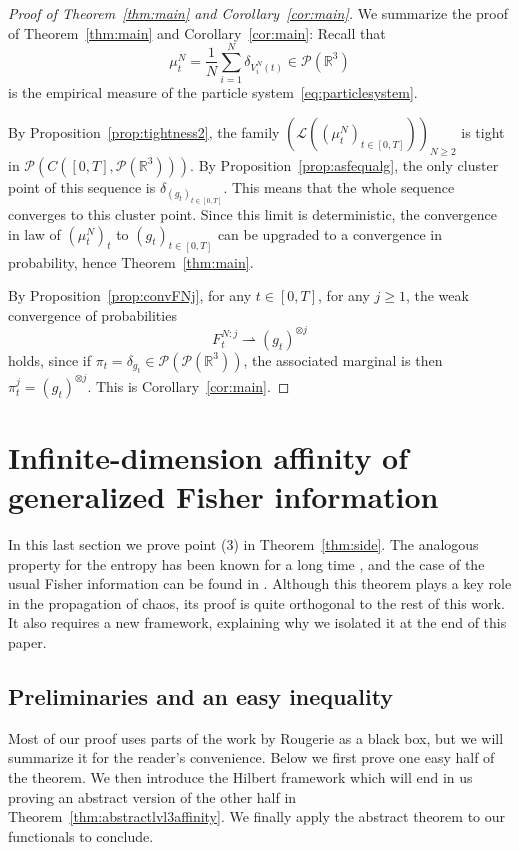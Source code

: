\documentclass[11pt,a4paper]{article}
\theoremstyle{definition}
\theoremstyle{plain}
\begin{document}
\begin{proof}[Proof of Theorem~\ref{thm:main} and Corollary~\ref{cor:main}]
We summarize the proof of Theorem~\ref{thm:main} and Corollary~\ref{cor:main}: Recall that $$\mu^N_t =\frac{1}{N}\sum_{i=1}^N \delta_{V^N_i(t)} \in \mathcal{P}(\mathbb{R}^3)$$ is the empirical measure of the particle system~\eqref{eq:particlesystem}.

By Proposition~\ref{prop:tightness2}, the family $\left(\mathcal{L}\left( (\mu^N_t)_{t\in[0,T]}\right) \right)_{N\geq 2 }$ is tight in $\mathcal{P} \left(C\left([0,T],\mathcal{P}(\mathbb{R}^3)\right)\right)$.
By Proposition~\ref{prop:asfequalg}, the only cluster point of this sequence is $\delta_{(g_t)_{t\in[0,T]}}$. This means that the whole sequence converges to this cluster point. Since this limit is deterministic, the convergence in law of $(\mu^N_t)_t$ to $(g_t)_{t\in[0,T]}$ can be upgraded to a convergence in probability, hence Theorem~\ref{thm:main}.

By Proposition~\ref{prop:convFNj}, for any $t\in[0,T]$, for any $j\geq 1$, the weak convergence of probabilities
$$F^{N:j}_t\rightharpoonup (g_t)^{\otimes j} $$
holds, since if $\pi_t=\delta_{g_t}\in\mathcal{P}(\mathcal{P}(\mathbb{R}^3))$, the associated marginal is then $\pi_t^j=(g_t)^{\otimes j}$. This is Corollary~\ref{cor:main}.
\end{proof}

\section{Infinite-dimension affinity of generalized Fisher information}
\label{sec:infdimlimofDandK}
In this last section we prove point (3) in Theorem~\ref{thm:side}. The analogous property for the entropy has been known for a long time \cite{RobinsonRuelle1967}, and the case of the usual Fisher information can be found in \cite{HaurayMischler2012,Rougerie2020}. Although this theorem plays a key role in the propagation of chaos, its proof is quite orthogonal to the rest of this work. It also requires a new framework, explaining why we isolated it at the end of this paper. 

\subsection{Preliminaries and an easy inequality}

Most of our proof uses parts of the work by Rougerie \cite{Rougerie2020} as a black box, but we will summarize it for the reader's convenience. Below we first prove one easy half of the theorem. We then introduce the Hilbert framework which will end in us proving an abstract version of the other half in Theorem~\ref{thm:abstractlvl3affinity}. We finally apply the abstract theorem to our functionals to conclude.
\end{document}
